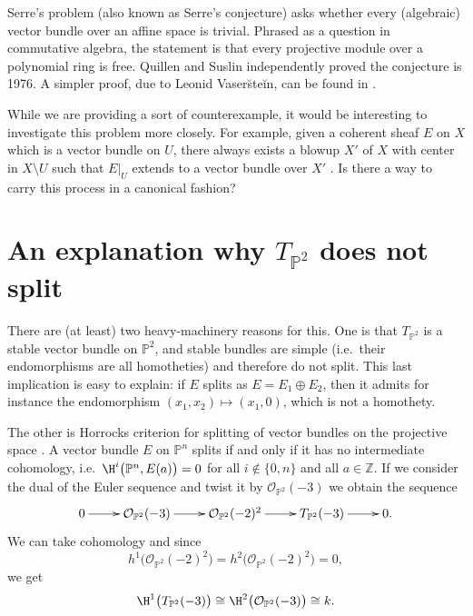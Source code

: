 \begin{remark}
  \label{T:Serre-problem}
  Serre's problem (also known as Serre's conjecture) asks whether every (algebraic) vector bundle over an affine space is trivial. Phrased as a question in commutative algebra, the statement is that every projective module over a polynomial ring is free. Quillen \cite{Quillen-projective-modules} and Suslin \cite{Suslin-projective-modules} independently proved the conjecture is 1976. A simpler proof, due to Leonid Vaser\u{s}te\u{i}n, can be found in \cite{Lang-algebra}.
\end{remark}

\begin{remark}
  While we are providing a sort of counterexample, it would be interesting to investigate this problem more closely. For example, given a coherent sheaf $E$ on $X$ which is a vector bundle on $U$, there always exists a blowup $X'$ of $X$ with center in $X \setminus U$ such that $E|_U$ extends to a vector bundle over $X'$ \cite[Theorem 4.1]{Raynaud-Flat-modules}. Is there a way to carry this process in a canonical fashion?
\end{remark}


\section{An explanation why $T_{\mathbb{P}^2}$ does not split}

There are (at least) two heavy\--machinery reasons for this. One is that $T_{\mathbb{P}^2}$ is a stable vector bundle on $\mathbb{P}^2$, and stable bundles are simple (i.e.\ their endomorphisms are all homotheties) and therefore do not split. This last implication is easy to explain: if $E$ splits as ${E=E_1\oplus E_2}$, then it admits for instance the endomorphism ${(x_1,x_2)\mapsto(x_1,0)}$, which is not a homothety.

The other is Horrocks criterion for splitting of vector bundles on the projective space \cite{Horrocks-Punctured-spectrum}. A vector bundle $E$ on $\mathbb{P}^n$ splits if and only if it has no intermediate cohomology, i.e.\ ${\H^i\big(\mathbb{P}^n,E(a)\big)=0}$ for all ${i\notin\{0,n\}}$ and all ${a\in\mathbb{Z}}$. If we consider the dual of the Euler sequence and twist it by ${\mathcal{O}_{\mathbb{P}^2}(-3)}$ we obtain the sequence
\[\xymatrix{0\ar[r] &\mathcal{O}_{\mathbb{P}^2}(-3)\ar[r] 
  &\mathcal{O}_{\mathbb{P}^2}(-2)^2\ar[r]
  &T_{\mathbb{P}^2}(-3)\ar[r] &0.}\]
We can take cohomology and since
\[
{h^1\big(\mathcal{O}_{\mathbb{P}^2}(-2)^2\big)=h^2\big(\mathcal{O}_{\mathbb{P}^2}(-2)^2\big)=0},
\]
we get
\[
{\H^1\big(T_{\mathbb{P}^2}(-3)\big)\cong \H^2\big(\mathcal{O}_{\mathbb{P}^2}(-3)\big)\cong k}.
\]

